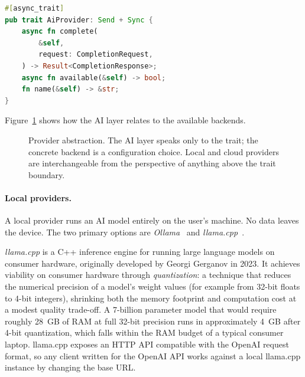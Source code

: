 \begin{lstlisting}[language=Rust, caption={AI provider trait}]
#[async_trait]
pub trait AiProvider: Send + Sync {
    async fn complete(
        &self,
        request: CompletionRequest,
    ) -> Result<CompletionResponse>;
    async fn available(&self) -> bool;
    fn name(&self) -> &str;
}
\end{lstlisting}

Figure~\ref{fig:providers} shows how the AI layer relates to the available
backends.

\begin{figure}[htbp]
\centering
{}
\caption{Provider abstraction. The AI layer speaks only to the trait; the
concrete backend is a configuration choice. Local and cloud providers are
interchangeable from the perspective of anything above the trait boundary.}
\label{fig:providers}
\end{figure}

\paragraph{Local providers.}
A local provider runs an AI model entirely on the user's machine. No data
leaves the device. The two primary options are \emph{Ollama}~\cite{ollama}
and \emph{llama.cpp}~\cite{llamacpp}.

\emph{llama.cpp} is a C++ inference engine for running large language models
on consumer hardware, originally developed by Georgi Gerganov in 2023. It
achieves viability on consumer hardware through \emph{quantization}: a
technique that reduces the numerical precision of a model's weight values
(for example from 32-bit floats to 4-bit integers), shrinking both the memory
footprint and computation cost at a modest quality trade-off. A 7-billion
parameter model that would require roughly 28~GB of RAM at full 32-bit
precision runs in approximately 4~GB after 4-bit quantization, which falls
within the RAM budget of a typical consumer laptop. llama.cpp exposes an HTTP
API compatible with the OpenAI request format, so any client written for the
OpenAI API works against a local llama.cpp instance by changing the base URL.

